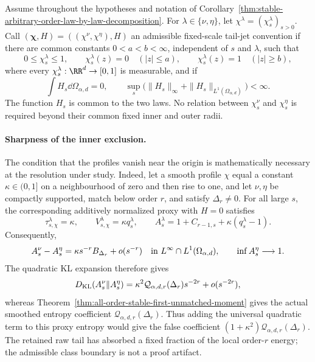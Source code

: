 Assume throughout the hypotheses and notation of
Corollary~\ref{thm:stable-arbitrary-order-law-by-law-decomposition}.  For
\(\lambda\in\{\nu,\eta\}\), let
\(\chi^\lambda=(\chi_s^\lambda)_{s>0}\).  Call
\((\boldsymbol\chi,H)=((\chi^\nu,\chi^\eta),H)\) an admissible fixed-scale
tail-jet convention if there are common constants
\(0<a<b<\infty\), independent of \(s\) and \(\lambda\), such that
\[
 0\le\chi_s^\lambda\le1,\qquad
 \chi_s^\lambda(z)=0\quad(|z|\le a),\qquad
 \chi_s^\lambda(z)=1\quad(|z|\ge b),
\]
where every \(\chi_s^\lambda:\RR^d\to[0,1]\) is measurable, and if
\[
 \int H_s\dd\Omega_{\alpha,d}=0,
 \qquad
 \sup_s\bigl(\|H_s\|_\infty+
        \|H_s\|_{L^1(\Omega_{\alpha,d})}\bigr)<\infty.
\]
The function \(H_s\) is common to the two laws.  No relation between
\(\chi_s^\nu\) and \(\chi_s^\eta\) is required beyond their common fixed
inner and outer radii.

\paragraph{Sharpness of the inner exclusion.}
The condition that the profiles vanish near the origin is mathematically
necessary at the resolution under study.  Indeed, let a smooth profile
\(\chi\) equal a constant \(\kappa\in(0,1]\) on a neighbourhood of zero and
then rise to one, and let \(\nu,\eta\) be compactly supported, match below
order \(r\), and satisfy \(\Delta_r\ne0\).  For all large \(s\),
the corresponding additively normalized proxy with \(H=0\) satisfies
\[
 \tau_{s,\chi}^\lambda=\kappa,
 \qquad V_{s,\chi}^\lambda=\kappa q_s^\lambda,
 \qquad
 A_s^\lambda=1+C_{r-1,s}+\kappa(q_s^\lambda-1).
\]
Consequently,
\[
 A_s^\nu-A_s^\eta
 =\kappa s^{-r}B_{\Delta_r}+o(s^{-r})
 \quad\hbox{in }L^\infty\cap L^1(\Omega_{\alpha,d}),
 \qquad \inf A_s^\eta\longrightarrow1.
\]
The quadratic KL expansion therefore gives
\[
 D_{\rm KL}(A_s^\nu\|A_s^\eta)
 =\kappa^2\mathcal Q_{\alpha,d,r}(\Delta_r)s^{-2r}
   +o(s^{-2r}),
\]
whereas Theorem~\ref{thm:all-order-stable-first-unmatched-moment} gives the
actual smoothed entropy coefficient
\(\mathcal Q_{\alpha,d,r}(\Delta_r)\).  Thus adding the universal quadratic
term to this proxy entropy would give the false coefficient
\((1+\kappa^2)\mathcal Q_{\alpha,d,r}(\Delta_r)\).  The retained raw tail has
absorbed a fixed fraction of the local order-\(r\) energy; the admissible
class boundary is not a proof artifact.

